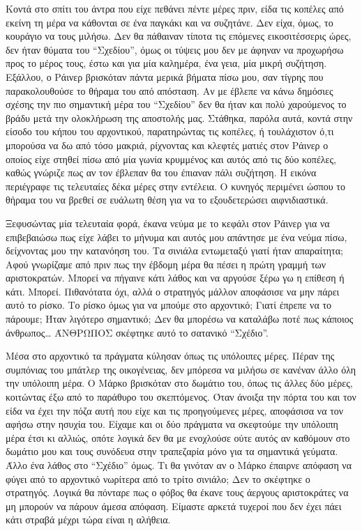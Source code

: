 \documentclass[12pt,twoside, openany]{book}
\begin{document}
Κοντά στο σπίτι του άντρα που είχε πεθάνει πέντε μέρες πριν, είδα τις κοπέλες από εκείνη τη μέρα να κάθονται σε ένα παγκάκι και να συζητάνε. Δεν είχα, όμως, το κουράγιο να τους μιλήσω. Δεν θα πάθαιναν τίποτα τις επόμενες εικοσιτέσσερις ώρες, δεν ήταν θύματα του “Σχεδίου”, όμως οι τύψεις μου δεν με άφηναν να προχωρήσω προς το μέρος τους, έστω και για μία καλημέρα, ένα γεια, μία μικρή συζήτηση. Εξάλλου, ο Ράινερ βρισκόταν πάντα μερικά βήματα πίσω μου, σαν τίγρης που παρακολουθούσε το θήραμα του από απόσταση. Αν με έβλεπε να κάνω δημόσιες σχέσης την πιο σημαντική μέρα του “Σχεδίου” δεν θα ήταν και πολύ χαρούμενος το βράδυ μετά την ολοκλήρωση της αποστολής μας. Στάθηκα, παρόλα αυτά, κοντά στην είσοδο του κήπου του αρχοντικού, παρατηρώντας τις κοπέλες, ή τουλάχιστον ό,τι μπορούσα να δω από τόσο μακριά, ρίχνοντας και κλεφτές ματιές στον Ράινερ ο οποίος είχε στηθεί πίσω από μία γωνία κρυμμένος και αυτός από τις δύο κοπέλες, καθώς γνώριζε πως αν τον έβλεπαν θα του έπιαναν πάλι συζήτηση. Η εικόνα περιέγραφε τις τελευταίες δέκα μέρες στην εντέλεια. Ο κυνηγός περιμένει ώσπου το θήραμα του να βρεθεί σε ευάλωτη θέση για να το εξουδετερώσει αιφνιδιαστικά.

Ξεφυσώντας μία τελευταία φορά, έκανα νεύμα με το κεφάλι στον Ράινερ για να επιβεβαιώσω πως είχε λάβει το μήνυμα και αυτός μου απάντησε με ένα νεύμα πίσω, δείχνοντας μου την κατανόηση του. Τα σινιάλα εντωμεταξύ γιατί ήταν απαραίτητα; Αφού γνωρίζαμε από πριν πως την έβδομη μέρα θα πέσει η πρώτη γραμμή των αριστοκρατών. Μπορεί να πήγαινε κάτι λάθος και να αργούσε ξέρω γω η επίθεση ή κάτι. Μπορεί. Πιθανότατα όχι, αλλά ο στρατηγός μάλλον αποφάσισε να μην πάρει αυτό το ρίσκο. Το ρίσκο όμως για να μπούμε στο αρχοντικό; Γιατί έπρεπε να το πάρουμε; Ήταν λιγότερο σημαντικό; Δεν θα μπορέσω να καταλάβω ποτέ πως κάποιος άνθρωπος… ΆΝΘΡΩΠΟΣ σκέφτηκε αυτό το σατανικό “Σχέδιο”.

Μέσα στο αρχοντικό τα πράγματα κύλησαν όπως τις υπόλοιπες μέρες. Πέραν της συμπόνιας του μπάτλερ της οικογένειας, δεν μπόρεσα να μιλήσω σε κανέναν άλλο όλη την υπόλοιπη μέρα. Ο Μάρκο βρισκόταν στο δωμάτιο του, όπως τις άλλες δύο μέρες, κοιτώντας έξω από το παράθυρο του σκεπτόμενος. Όταν άνοιξα την πόρτα του και τον είδα να έχει την πόζα αυτή που είχε και τις προηγούμενες μέρες, αποφάσισα να τον αφήσω στην ησυχία του. Είχαμε και οι δύο πράγματα να σκεφτούμε την υπόλοιπη μέρα έτσι κι αλλιώς, οπότε λογικά δεν θα με ενοχλούσε ούτε αυτός αν καθόμουν στο δωμάτιο μου και τους συνόδευα στην τραπεζαρία μόνο για τα σημαντικά γεύματα. Άλλο ένα λάθος στο “Σχέδιο” όμως. Τι θα γινόταν αν ο Μάρκο έπαιρνε απόφαση να φύγει από το αρχοντικό νωρίτερα από το τρίτο σινιάλο; Δεν το σκέφτηκε ο στρατηγός. Λογικά θα πόνταρε πως ο φόβος θα έκανε τους άεργους αριστοκράτες να μη μπορούν να πάρουν άμεσα απόφαση. Είμαστε αρκετά τυχεροί που δεν έχει πάει κάτι στραβά μέχρι τώρα είναι η αλήθεια.
\end{document}
